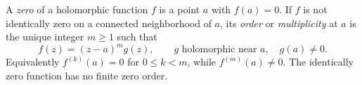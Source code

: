 
A \emph{zero} of a holomorphic function $f$ is a point $a$ with $f(a)=0$. If $f$ is not identically zero on a connected neighborhood of $a$, its \emph{order} or \emph{multiplicity} at $a$ is the unique integer $m\ge1$ such that
\[
f(z)=(z-a)^m g(z),\qquad g\text{ holomorphic near }a,\quad g(a)\ne0.
\]
Equivalently $f^{(k)}(a)=0$ for $0\le k<m$, while $f^{(m)}(a)\ne0$. The identically zero function has no finite zero order.
